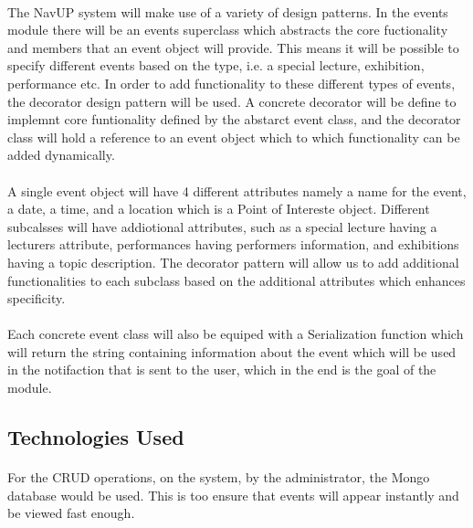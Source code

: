\documentclass{article}
\begin{document}
\paragraph{} The NavUP system will make use of a variety of design patterns. In the events module there will be an events superclass which abstracts the core fuctionality and members that an event object will provide. This means it will be possible to specify different events based on the type, i.e. a special lecture, exhibition, performance etc. In order to add functionality to these different types of events, the decorator design pattern will be used. A concrete decorator will be define to implemnt core funtionality defined by the abstarct event class, and the decorator class will hold a reference to an event object which to which functionality can be added dynamically.

\paragraph{} A single event object will have 4 different attributes namely a name for the event, a date, a time, and a location which is a Point of Intereste object. Different subcalsses will have addiotional attributes, such as a special lecture having a lecturers attribute, performances having performers information, and exhibitions having a topic description. The decorator pattern will allow us to add additional functionalities to each subclass based on the additional attributes which enhances specificity. 

\paragraph{} Each concrete event class will also be equiped with a Serialization function which will return the string containing information about the event which will be used in the notifaction that is sent to the user, which in the end is the goal of the module.  

\subsection{Technologies Used}
\paragraph{} For the CRUD operations, on the system, by the administrator, the Mongo database would be used. This is too ensure that events will appear instantly and be viewed fast enough.
\end{document}

